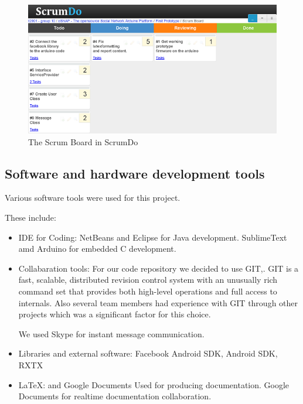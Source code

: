 \begin{figure}[h!]
\centering \includegraphics{img/mgmt-scrumdo} \caption{The Scrum Board in ScrumDo}
\label{fig:mgmt-scrumdo}
\end{figure}

\newpage
\subsection{Software and hardware development tools}
Various software tools were used for this project.

These include:\newline
\begin{itemize}
	\item{IDE for Coding:} \newline
	NetBeans and Eclipse for Java development. SublimeText amd Arduino for embedded C development.

	\item{Collabaration tools:} \newline
	For our code repository we decided to use GIT,. GIT is a fast, scalable, distributed revision control system 
	with an unusually rich command set that provides both high-level operations and full access to internals. Also 
	several team members had experience with GIT through other projects which was a significant factor for 
	this choice.

	We used Skype for instant message communication.

	\item{Libraries and external software:} \newline
	 Facebook Android SDK, Android SDK, RXTX

	\item{\LaTeX{}: and Google Documents} \newline
	Used for producing documentation. Google Documents for realtime documentation collaboration.

\end{itemize}

